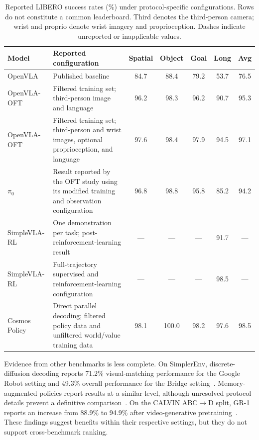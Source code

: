 \documentclass{ieeeaccess}
\begin{document}
\begin{table}[!t]
\caption{Reported LIBERO success rates (\%) under protocol-specific configurations. Rows do not constitute a common leaderboard. Third denotes the third-person camera; wrist and proprio denote wrist imagery and proprioception. Dashes indicate unreported or inapplicable values.}
\label{tab:libero}
\centering
\scriptsize
\setlength{\tabcolsep}{3pt}
\begin{tabular}{p{3.0cm}p{5.0cm}ccccc}
\toprule
Model & Reported configuration & Spatial & Object & Goal & Long & Avg \\
\midrule
OpenVLA~\cite{openvla} &
Published baseline &
84.7 & 88.4 & 79.2 & 53.7 & 76.5 \\

OpenVLA-OFT~\cite{openvlaoft} &
Filtered training set; third-person image and language &
96.2 & 98.3 & 96.2 & 90.7 & 95.3 \\

OpenVLA-OFT~\cite{openvlaoft} &
Filtered training set; third-person and wrist images, optional proprioception, and language &
97.6 & 98.4 & 97.9 & 94.5 & 97.1 \\

$\pi_0$~\cite{openvlaoft} &
Result reported by the OFT study using its modified training and observation configuration &
96.8 & 98.8 & 95.8 & 85.2 & 94.2 \\

SimpleVLA-RL~\cite{simplevlarl} &
One demonstration per task; post-reinforcement-learning result &
--- & --- & --- & 91.7 & --- \\

SimpleVLA-RL~\cite{simplevlarl} &
Full-trajectory supervised and reinforcement-learning configuration &
--- & --- & --- & 98.5 & --- \\

Cosmos Policy~\cite{cosmospolicy} &
Direct parallel decoding; filtered policy data and unfiltered world/value training data &
98.1 & 100.0 & 98.2 & 97.6 & 98.5 \\
\bottomrule
\end{tabular}
\end{table}

Evidence from other benchmarks is less complete. On SimplerEnv, discrete-diffusion decoding reports 71.2\% visual-matching performance for the Google Robot setting and 49.3\% overall performance for the Bridge setting~\cite{ddvla}. Memory-augmented policies report results at a similar level, although unresolved protocol details prevent a definitive comparison~\cite{memoryvla}. On the CALVIN ABC$\to$D split, GR-1 reports an increase from 88.9\% to 94.9\% after video-generative pretraining~\cite{gr1}. These findings suggest benefits within their respective settings, but they do not support cross-benchmark ranking.
\end{document}
